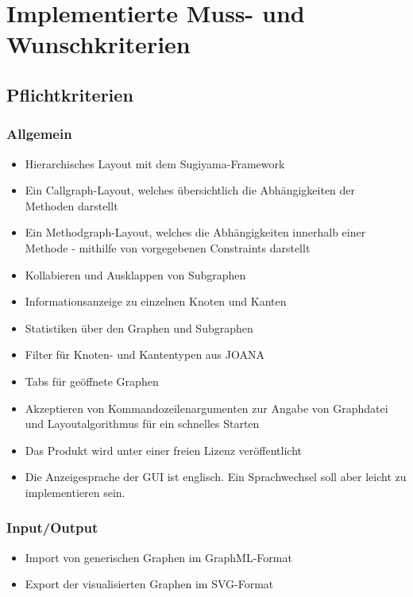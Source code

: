 \chapter{Implementierte Muss- und Wunschkriterien}
\label{ch:implkrit}

\section{Pflichtkriterien}

\subsection{Allgemein}
\begin{itemize}
	\item Hierarchisches Layout mit dem Sugiyama-Framework
	\item Ein Callgraph-Layout, welches übersichtlich die Abhängigkeiten der Methoden darstellt
	\item Ein Methodgraph-Layout, welches die Abhängigkeiten innerhalb einer Methode - mithilfe von vorgegebenen Constraints darstellt
	\item Kollabieren und Ausklappen von Subgraphen
	\item Informationsanzeige zu einzelnen Knoten und Kanten
	\item Statistiken über den Graphen und Subgraphen
	\item Filter für Knoten- und Kantentypen aus JOANA
	\item Tabs für geöffnete Graphen
	\item Akzeptieren von Kommandozeilenargumenten zur Angabe von Graphdatei und Layoutalgorithmus für ein schnelles Starten
	\item Das Produkt wird unter einer freien Lizenz veröffentlicht
	\item Die Anzeigesprache der GUI ist englisch. Ein Sprachwechsel soll aber leicht zu implementieren sein.
\end{itemize}

\subsection{Input/Output}
\begin{itemize}
	\item Import von generischen Graphen im GraphML-Format
	\item Export der visualisierten Graphen im SVG-Format
\end{itemize}

